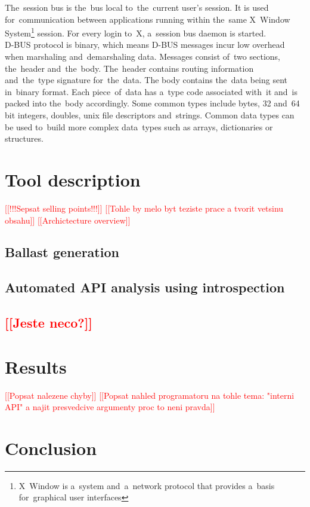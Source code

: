 \documentclass[conference]{IEEEtran}
\newcommand{\addtodo}[1]{\textcolor{red}{[[#1]]}}
\newcommand{\dummytext}{\textcolor{light-gray}{\Blindtext}}
\begin{document}
The~session bus is the~bus local to~the~current user's session. It is used
for~communication between applications running within the~same X~Window System\footnote{X~Window is a~system and~a~network protocol that provides a~basis
for~graphical user interfaces} session. For every login to~X, a~session bus
daemon is started.\\

D-BUS protocol is binary, which means D-BUS messages incur low overhead when
marshaling and~demarshaling data. Messages consist of~two sections, the~header
and~the~body. The~header contains routing information and~the~type signature
for~the~data. The body contains the~data being sent in~binary format. Each
piece~of~data has a~type code \mbox{associated} with~it and~is packed into the~body
accordingly. Some common types include bytes, 32 and~64 bit integers, doubles,
unix file descriptors and~strings. Common data types can be used to~build more
complex data~types such as arrays, dictionaries or structures.



\section{Tool description}
\addtodo{!!!Sepsat selling points!!!}
\addtodo{Tohle by melo byt teziste prace a tvorit vetsinu obsahu}
\addtodo{Archictecture overview}
\subsection{Ballast generation}
\dummytext
\dummytext
\subsection{Automated API analysis using introspection}
\dummytext
\dummytext
\subsection{\addtodo{Jeste neco?}}
\dummytext

\section{Results}
\addtodo{Popsat nalezene chyby}
\addtodo{Popsat nahled programatoru na tohle tema: "interni API" a najit presvedcive argumenty proc to neni pravda}
\dummytext
\dummytext

\section{Conclusion}
\dummytext
\end{document}
